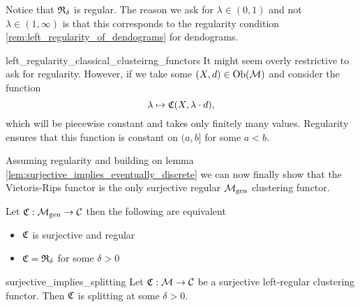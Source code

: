 Notice that $\mathfrak{R}_\delta$ is regular. The reason we ask for $\lambda \in (0,1)$ and not $\lambda \in (1, \infty)$ is that this corresponds to the regularity condition \ref{rem:left_regularity_of_dendograms} for dendograms.\par

\begin{myremark}{}{left_regularity_classical_clusteirng_functors}
    \medskip It might seem overly restrictive to ask for regularity.
    However, if we take some $(X, d) \in \mathrm {Ob}(\mathcal{M})$ and consider the function 
    $$
    \lambda \mapsto \mathfrak{C}(X, \lambda \cdot d),
    $$
    which will be piecewise constant and takes only finitely many values.
    Regularity ensures that this function is constant on $(a, b]$ for some $a < b$.
\end{myremark}

Assuming regularity and building on lemma \ref{lem:surjective_implies_eventually_discrete} we can now finally show that the Vietoris-Rips functor is the only surjective regular ${\mathcal{M}_\mathrm{gen}}$ clustering functor.

\begin{theorem}{}{}
    Let $\mathfrak{C}: {\mathcal{M}_\mathrm{gen}} \to \mathcal{C}$ then the following are equivalent

    \begin{itemize}
        \item $\mathfrak{C}$ is surjective and regular
        \item $\mathfrak{C} = \mathfrak{R}_{\delta}$ for some $\delta > 0$
    \end{itemize}
\end{theorem}

\begin{lemma}{}{surjective_implies_splitting}
    Let $\mathfrak{C}: \mathcal{M} \to \mathcal{C}$ be a surjective left-regular clustering functor. Then $\mathfrak{C}$ is splitting at some $\delta > 0$.

\end{lemma}

